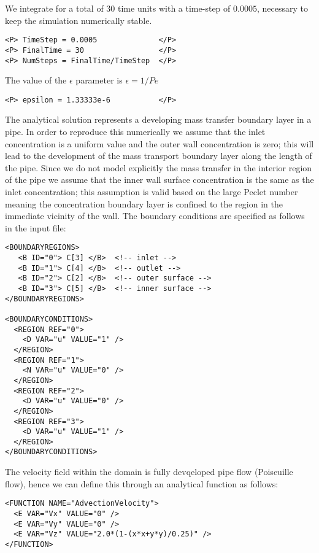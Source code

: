 We integrate for a total of $30$ time units with a time-step of $0.0005$,
necessary to keep the simulation numerically stable.
\begin{lstlisting}[style=XMLStyle]
<P> TimeStep = 0.0005              </P>
<P> FinalTime = 30                 </P>
<P> NumSteps = FinalTime/TimeStep  </P>
\end{lstlisting}

The value of the $\epsilon$ parameter is $\epsilon = 1/Pe$
\begin{lstlisting}[style=XMLStyle]
<P> epsilon = 1.33333e-6           </P>
\end{lstlisting}

The analytical solution represents a developing mass transfer boundary layer in
a pipe. In order to reproduce this numerically we assume that the inlet
concentration is a uniform value and the outer wall concentration is zero; this
will lead to the development of the mass transport boundary layer along the
length of the pipe. Since we do not model explicitly the mass transfer in the
interior region of the pipe we assume that the inner wall surface concentration
is the same as the inlet concentration; this assumption is valid based on the
large Peclet number meaning the concentration boundary layer is confined to the
region in the immediate vicinity of the wall. The boundary conditions are
specified as follows in the input file:
\begin{lstlisting}[style=XMLStyle]
<BOUNDARYREGIONS>
   <B ID="0"> C[3] </B>  <!-- inlet -->
   <B ID="1"> C[4] </B>  <!-- outlet -->
   <B ID="2"> C[2] </B>  <!-- outer surface -->
   <B ID="3"> C[5] </B>  <!-- inner surface -->
</BOUNDARYREGIONS>

<BOUNDARYCONDITIONS>
  <REGION REF="0">
    <D VAR="u" VALUE="1" />
  </REGION>
  <REGION REF="1">
    <N VAR="u" VALUE="0" />
  </REGION>
  <REGION REF="2">
    <D VAR="u" VALUE="0" />
  </REGION>
  <REGION REF="3">
    <D VAR="u" VALUE="1" />
  </REGION>
</BOUNDARYCONDITIONS>
\end{lstlisting}

The velocity field within the domain is fully devqeloped pipe flow (Poiseuille
flow), hence we can define this through an analytical function as follows:
\begin{lstlisting}[style=XMLStyle]
<FUNCTION NAME="AdvectionVelocity">
  <E VAR="Vx" VALUE="0" />
  <E VAR="Vy" VALUE="0" />
  <E VAR="Vz" VALUE="2.0*(1-(x*x+y*y)/0.25)" />
</FUNCTION>
\end{lstlisting}

